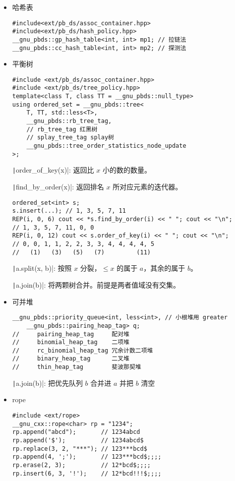 \begin{itemize}
\item 哈希表
\begin{verbatim}
#include<ext/pb_ds/assoc_container.hpp>
#include<ext/pb_ds/hash_policy.hpp>
__gnu_pbds::gp_hash_table<int, int> mp1; // 拉链法
__gnu_pbds::cc_hash_table<int, int> mp2; // 探测法
\end{verbatim}
\item 平衡树
\begin{verbatim}
#include <ext/pb_ds/assoc_container.hpp>
#include <ext/pb_ds/tree_policy.hpp>
template<class T, class TT = __gnu_pbds::null_type>
using ordered_set = __gnu_pbds::tree<
	T, TT, std::less<T>,
	__gnu_pbds::rb_tree_tag,
	// rb_tree_tag 红黑树
	// splay_tree_tag splay树
	__gnu_pbds::tree_order_statistics_node_update
>;
\end{verbatim}
\texttt|order_of_key(x)|: 返回比 $x$ 小的数的数量。

\texttt|find_by_order(x)|: 返回排名 $x$ 所对应元素的迭代器。

\begin{verbatim}
ordered_set<int> s;
s.insert(...); // 1, 3, 5, 7, 11
REP(i, 0, 6) cout << *s.find_by_order(i) << " "; cout << "\n";
// 1, 3, 5, 7, 11, 0, 0
REP(i, 0, 12) cout << s.order_of_key(i) << " "; cout << "\n";
// 0, 0, 1, 1, 2, 2, 3, 3, 4, 4, 4, 4, 5
//   (1)   (3)   (5)   (7)         (11)
\end{verbatim}

\texttt|a.split(x, b)|: 按照 $x$ 分裂，$\leq x$ 的属于 $a$，其余的属于 $b$。

\texttt|a.join(b)|: 将两颗树合并。前提是两者值域没有交集。
\item 可并堆
\begin{verbatim}
__gnu_pbds::priority_queue<int, less<int>, // 小根堆用 greater
	__gnu_pbds::pairing_heap_tag> q;
//     pairing_heap_tag     配对堆
//     binomial_heap_tag    二项堆
//     rc_binomial_heap_tag 冗余计数二项堆
//     binary_heap_tag      二叉堆
//     thin_heap_tag        斐波那契堆
\end{verbatim}

\texttt|a.join(b)|: 把优先队列 $b$ 合并进 $a$ 并把 $b$ 清空

\item rope

\begin{verbatim}
#include <ext/rope>
__gnu_cxx::rope<char> rp = "1234";
rp.append("abcd");       // 1234abcd
rp.append('$');          // 1234abcd$
rp.replace(3, 2, "***"); // 123***bcd$
rp.append(4, ';');       // 123***bcd$;;;;
rp.erase(2, 3);          // 12*bcd$;;;;
rp.insert(6, 3, '!');    // 12*bcd!!!$;;;;
\end{verbatim}
\end{itemize}

